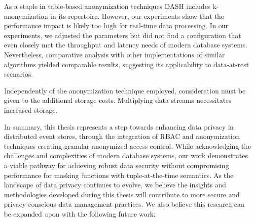 As a staple in table-based anonymization techniques \ac{DASH} includes k-anonymization in its repertoire. However, our experiments show that the performance impact is likely too high for real-time data processing. In our experiments, we adjusted the parameters but did not find a configuration that even closely met the throughput and latency needs of modern database systems. Nevertheless, comparative analysis with other implementations of similar algorithms yielded comparable results, suggesting its applicability to data-at-rest scenarios. \par
Independently of the anonymization technique employed, consideration must be given to the additional storage costs. Multiplying data streams necessitates increased storage. \par 
In summary, this thesis represents a step towards enhancing data privacy in distributed event stores, through the integration of \ac{RBAC} and anonymization techniques creating granular anonymized access control. While acknowledging the challenges and complexities of modern database systems, our work demonstrates a viable pathway for achieving robust data security without compromising performance for masking functions with tuple-at-the-time semantics. As the landscape of data privacy continues to evolve, we believe the insights and methodologies developed during this thesis will contribute to more secure and privacy-conscious data management practices. We also believe this research can be expanded upon with the following future work:

